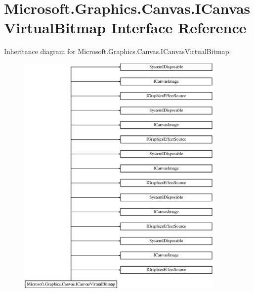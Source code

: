 \hypertarget{interface_microsoft_1_1_graphics_1_1_canvas_1_1_i_canvas_virtual_bitmap}{}\section{Microsoft.\+Graphics.\+Canvas.\+I\+Canvas\+Virtual\+Bitmap Interface Reference}
\label{interface_microsoft_1_1_graphics_1_1_canvas_1_1_i_canvas_virtual_bitmap}
Inheritance diagram for Microsoft.\+Graphics.\+Canvas.\+I\+Canvas\+Virtual\+Bitmap\+:\begin{figure}[H]
\begin{center}
\leavevmode
\includegraphics[height=12.000000cm]{interface_microsoft_1_1_graphics_1_1_canvas_1_1_i_canvas_virtual_bitmap}
\end{center}
\end{figure}
